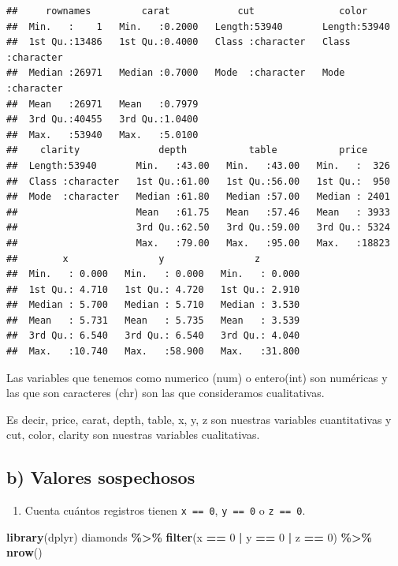 \documentclass[
  spanish,
]{article}
\newenvironment{Shaded}{\begin{snugshade}}{\end{snugshade}}
\newcommand{\DecValTok}[1]{\textcolor[rgb]{0.00,0.00,0.81}{#1}}
\newcommand{\FunctionTok}[1]{\textcolor[rgb]{0.13,0.29,0.53}{\textbf{#1}}}
\newcommand{\NormalTok}[1]{#1}
\newcommand{\SpecialCharTok}[1]{\textcolor[rgb]{0.81,0.36,0.00}{\textbf{#1}}}
\providecommand{\tightlist}{%
  \setlength{\itemsep}{0pt}\setlength{\parskip}{0pt}}
\begin{document}
\begin{verbatim}
##     rownames         carat            cut               color          
##  Min.   :    1   Min.   :0.2000   Length:53940       Length:53940      
##  1st Qu.:13486   1st Qu.:0.4000   Class :character   Class :character  
##  Median :26971   Median :0.7000   Mode  :character   Mode  :character  
##  Mean   :26971   Mean   :0.7979                                        
##  3rd Qu.:40455   3rd Qu.:1.0400                                        
##  Max.   :53940   Max.   :5.0100                                        
##    clarity              depth           table           price      
##  Length:53940       Min.   :43.00   Min.   :43.00   Min.   :  326  
##  Class :character   1st Qu.:61.00   1st Qu.:56.00   1st Qu.:  950  
##  Mode  :character   Median :61.80   Median :57.00   Median : 2401  
##                     Mean   :61.75   Mean   :57.46   Mean   : 3933  
##                     3rd Qu.:62.50   3rd Qu.:59.00   3rd Qu.: 5324  
##                     Max.   :79.00   Max.   :95.00   Max.   :18823  
##        x                y                z         
##  Min.   : 0.000   Min.   : 0.000   Min.   : 0.000  
##  1st Qu.: 4.710   1st Qu.: 4.720   1st Qu.: 2.910  
##  Median : 5.700   Median : 5.710   Median : 3.530  
##  Mean   : 5.731   Mean   : 5.735   Mean   : 3.539  
##  3rd Qu.: 6.540   3rd Qu.: 6.540   3rd Qu.: 4.040  
##  Max.   :10.740   Max.   :58.900   Max.   :31.800
\end{verbatim}

Las variables que tenemos como numerico (num) o entero(int) son
numéricas y las que son caracteres (chr) son las que consideramos
cualitativas.

Es decir, price, carat, depth, table, x, y, z son nuestras variables
cuantitativas y cut, color, clarity son nuestras variables cualitativas.

\subsection*{b) Valores sospechosos}\label{b-valores-sospechosos}

\begin{enumerate}
\def\labelenumi{\arabic{enumi}.}
\tightlist
\item
  Cuenta cuántos registros tienen \texttt{x\ ==\ 0}, \texttt{y\ ==\ 0} o
  \texttt{z\ ==\ 0}.
\end{enumerate}

\begin{Shaded}
\begin{Highlighting}[]
\FunctionTok{library}\NormalTok{(dplyr)}
\NormalTok{diamonds }\SpecialCharTok{\%\textgreater{}\%}
  \FunctionTok{filter}\NormalTok{(x }\SpecialCharTok{==} \DecValTok{0} \SpecialCharTok{|}\NormalTok{ y }\SpecialCharTok{==} \DecValTok{0} \SpecialCharTok{|}\NormalTok{ z }\SpecialCharTok{==} \DecValTok{0}\NormalTok{) }\SpecialCharTok{\%\textgreater{}\%}
  \FunctionTok{nrow}\NormalTok{()}
\end{Highlighting}
\end{Shaded}
\end{document}

